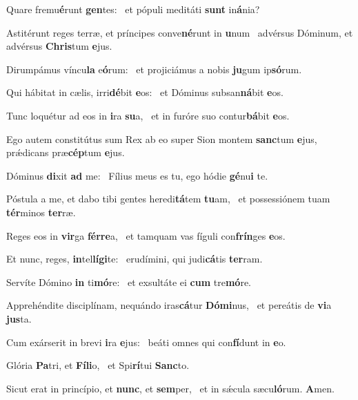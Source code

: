 \item Quare fremu\textbf{é}runt \textbf{gen}tes:~\psstar{} et pópuli meditáti \textbf{sunt} in\textbf{á}nia?
\item Astitérunt reges terræ, et príncipes conve\textbf{né}runt in \textbf{u}num~\psstar{} advérsus Dóminum, et advérsus \textbf{Chris}tum \textbf{e}jus.
\item Dirumpámus víncu\textbf{la} e\textbf{ó}rum:~\psstar{} et projiciámus a nobis \textbf{ju}gum ip\textbf{só}rum.
\item Qui hábitat in cælis, irri\textbf{dé}bit \textbf{e}os:~\psstar{} et Dóminus subsan\textbf{ná}bit \textbf{e}os.
\item Tunc loquétur ad eos in \textbf{i}ra \textbf{su}a,~\psstar{} et in furóre suo contur\textbf{bá}bit \textbf{e}os.
\item Ego autem constitútus sum Rex ab eo super Sion montem \textbf{sanc}tum \textbf{e}jus,~\psstar{} prǽdicans præ\textbf{cép}tum \textbf{e}jus.
\item Dóminus \textbf{di}xit \textbf{ad} me:~\psstar{} Fílius meus es tu, ego hódie \textbf{gé}nu\textbf{i} te.
\item Póstula a me, et dabo tibi gentes heredi\textbf{tá}tem \textbf{tu}am,~\psstar{} et possessiónem tuam \textbf{tér}minos \textbf{ter}ræ.
\item Reges eos in \textbf{vir}ga \textbf{fér}\textbf{re}a,~\psstar{} et tamquam vas fíguli con\textbf{frín}ges \textbf{e}os.
\item Et nunc, reges, \textbf{in}tel\textbf{lí}\textbf{gi}te:~\psstar{} erudímini, qui judi\textbf{cá}tis \textbf{ter}ram.
\item Servíte Dómino \textbf{in} ti\textbf{mó}re:~\psstar{} et exsultáte ei \textbf{cum} tre\textbf{mó}re.
\item Apprehéndite disciplínam, nequándo iras\textbf{cá}tur \textbf{Dó}\textbf{mi}nus,~\psstar{} et pereátis de \textbf{vi}a \textbf{jus}ta.
\item Cum exárserit in brevi \textbf{i}ra \textbf{e}jus:~\psstar{} beáti omnes qui con\textbf{fí}dunt in \textbf{e}o.
\item Glória \textbf{Pa}tri, et \textbf{Fí}\textbf{li}o,~\psstar{} et Spi\textbf{rí}tui \textbf{Sanc}to.
\item Sicut erat in princípio, et \textbf{nunc}, et \textbf{sem}per,~\psstar{} et in sǽcula sæcu\textbf{ló}rum. \textbf{A}men.
